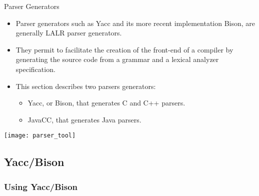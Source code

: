 \begin{bibunit}[apalike]
\begin{frame}{Parser Generators}
	\begin{itemize}
	\item Parser generators such as Yacc and its more recent implementation Bison,  are generally LALR parser generators.
	\item They permit to facilitate the creation of the front-end of a compiler by generating the source code from a grammar and a lexical analyzer specification.
	\vfill
	\item This section describes two parsers generators:
		\begin{itemize}
		\item Yacc, or Bison, that generates C and C++ parsers.
		\item JavaCC, that generates Java parsers.
		\end{itemize}
	\end{itemize}
	\begin{center}
		\texttt{[image: parser\_tool]}
	\end{center}
\end{frame}

\subsection{Yacc/Bison}

\tableofcontentslide[sectionstyle={show/shaded},subsectionstyle={show/shaded/hide},subsubsectionstyle={show/show/hide/hide}]

\subsubsection{Using Yacc/Bison}



\end{bibunit}
